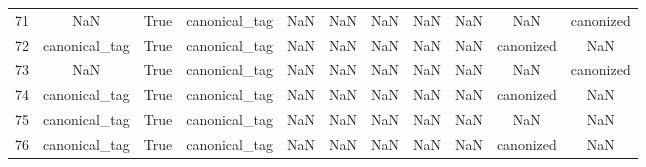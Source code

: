 \begin{table}[h!]
{\begin{tabular}{|c|c|c|c|c|c|c|c|c|c|c|}
         71 &                       NaN &                              True &                canonical\_tag &                                  NaN &                                  NaN &                                  NaN &                                  NaN &                                  NaN &                                  NaN &                                          canonized \\
         72 &             canonical\_tag &                              True &                canonical\_tag &                                  NaN &                                  NaN &                                  NaN &                                  NaN &                                  NaN &                            canonized &                                                NaN \\
         73 &                       NaN &                              True &                canonical\_tag &                                  NaN &                                  NaN &                                  NaN &                                  NaN &                                  NaN &                                  NaN &                                          canonized \\
         74 &             canonical\_tag &                              True &                canonical\_tag &                                  NaN &                                  NaN &                                  NaN &                                  NaN &                                  NaN &                            canonized &                                                NaN \\
         75 &             canonical\_tag &                              True &                canonical\_tag &                                  NaN &                                  NaN &                                  NaN &                                  NaN &                                  NaN &                                  NaN &                                                NaN \\
         76 &             canonical\_tag &                              True &                canonical\_tag &                                  NaN &                                  NaN &                                  NaN &                                  NaN &                                  NaN &                            canonized &                                                NaN \\

\end{tabular}}
\end{table}
